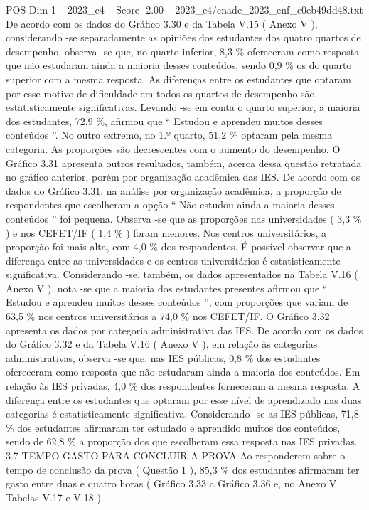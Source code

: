 \begin{textsample}{POS Dim 1 – 2023\_c4 – Score -2.00 – 2023\_c4/enade\_2023\_enf\_e0eb49dd48.txt}
De acordo com os dados do Gráfico 3.30 e da Tabela V.15 ( Anexo V ), considerando -se separadamente as opiniões dos estudantes dos quatro quartos de desempenho, observa -se que, no quarto inferior, 8,3 \% ofereceram como resposta que não estudaram ainda a maioria desses conteúdos, sendo 0,9 \% os do quarto superior com a mesma resposta.
As diferenças entre os estudantes que optaram por esse motivo de dificuldade em todos os quartos de desempenho são estatisticamente significativas.
Levando -se em conta o quarto superior, a maioria dos estudantes, 72,9 \%, afirmou que “ Estudou e aprendeu muitos desses conteúdos ”.
No outro extremo, no 1.º quarto, 51,2 \% optaram pela mesma categoria.
As proporções são decrescentes com o aumento do desempenho.
O Gráfico 3.31 apresenta outros resultados, também, acerca dessa questão retratada no gráfico anterior, porém por organização acadêmica das IES.
De acordo com os dados do Gráfico 3.31, na análise por organização acadêmica, a proporção de respondentes que escolheram a opção “ Não estudou ainda a maioria desses conteúdos ” foi pequena.
Observa -se que as proporções nas universidades ( 3,3 \% ) e nos CEFET/IF ( 1,4 \% ) foram menores.
Nos centros universitários, a proporção foi mais alta, com 4,0 \% dos respondentes.
É possível observar que a diferença entre as universidades e os centros universitários é estatisticamente significativa.
Considerando -se, também, os dados apresentados na Tabela V.16 ( Anexo V ), nota -se que a maioria dos estudantes presentes afirmou que “ Estudou e aprendeu muitos desses conteúdos ”, com proporções que variam de 63,5 \% nos centros universitários a 74,0 \% nos CEFET/IF.
O Gráfico 3.32 apresenta os dados por categoria administrativa das IES.
De acordo com os dados do Gráfico 3.32 e da Tabela V.16 ( Anexo V ), em relação às categorias administrativas, observa -se que, nas IES públicas, 0,8 \% dos estudantes ofereceram como resposta que não estudaram ainda a maioria dos conteúdos.
Em relação às IES privadas, 4,0 \% dos respondentes forneceram a mesma resposta.
A diferença entre os estudantes que optaram por esse nível de aprendizado nas duas categorias é estatisticamente significativa.
Considerando -se as IES públicas, 71,8 \% dos estudantes afirmaram ter estudado e aprendido muitos dos conteúdos, sendo de 62,8 \% a proporção dos que escolheram essa resposta nas IES privadas. 3.7 TEMPO GASTO PARA CONCLUIR A PROVA Ao responderem sobre o tempo de conclusão da prova ( Questão 1 ), 85,3 \% dos estudantes afirmaram ter gasto entre duas e quatro horas ( Gráfico 3.33 a Gráfico 3.36 e, no Anexo V, Tabelas V.17 e V.18 ).

\end{textsample}
